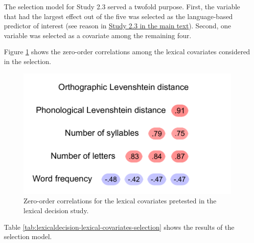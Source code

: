 \documentclass[
  12pt,
  man,floatsintext]{apa7}
\begin{document}
The selection model for Study 2.3 served a twofold purpose. First, the variable that had the largest effect out of the five was selected as the language-based predictor of interest (see reason in \protect\hyperlink{lexicaldecision}{\underline{Study 2.3 in the main text}}). Second, one variable was selected as a covariate among the remaining four.

Figure \ref{fig:lexicaldecision-lexical-covariates-correlations} shows the zero-order correlations among the lexical covariates considered in the selection.

\begin{figure}

{\centering \includegraphics[width=0.5\linewidth]{thesis-core_files/figure-latex/lexicaldecision-lexical-covariates-correlations-1} 

}

\caption{Zero-order correlations for the lexical covariates pretested in the lexical decision study.}\label{fig:lexicaldecision-lexical-covariates-correlations}
\end{figure}

Table \ref{tab:lexicaldecision-lexical-covariates-selection} shows the results of the selection model.
\end{document}
